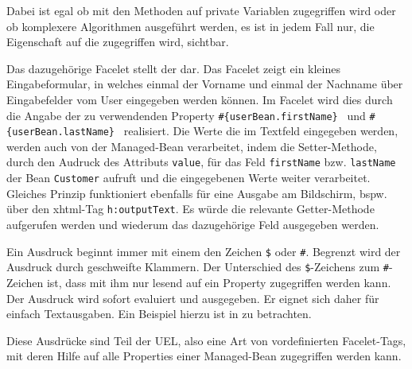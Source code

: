 \documentclass[12pt, twoside, a4paper, ngerman]{article}
\begin{document}
Dabei ist egal ob mit den Methoden auf private Variablen zugegriffen wird oder ob komplexere Algorithmen ausgeführt werden, es ist in jedem Fall nur, die Eigenschaft auf die zugegriffen wird, sichtbar.

Das dazugehörige Facelet stellt der  dar. Das Facelet zeigt ein kleines Eingabeformular, in welches einmal der Vorname und einmal der Nachname über Eingabefelder vom User eingegeben werden können. Im Facelet wird dies durch die Angabe der zu verwendenden Property \texttt{\#\{userBean.firstName\} } und \texttt{\#\{userBean.lastName\} } realisiert. Die Werte die im Textfeld eingegeben werden, werden auch von der Managed-Bean verarbeitet, indem die Setter-Methode, durch den Audruck des Attributs \texttt{value}, für das Feld \texttt{firstName} bzw. \texttt{lastName} der Bean \texttt{Customer} aufruft und die eingegebenen Werte weiter verarbeitet.
Gleiches Prinzip funktioniert ebenfalls für eine Ausgabe am Bildschirm, bspw. über den xhtml-Tag \texttt{h:outputText}. Es würde die relevante Getter-Methode aufgerufen werden und wiederum das dazugehörige Feld ausgegeben werden. 

	

Ein Ausdruck beginnt immer mit einem den Zeichen \texttt{\$} oder \texttt{\#}. Begrenzt wird der Ausdruck durch geschweifte Klammern. Der Unterschied des \texttt{\$}-Zeichens zum \texttt{\#}-Zeichen ist, dass mit ihm nur lesend auf ein Property zugegriffen werden kann.
Der Ausdruck wird sofort evaluiert und ausgegeben. Er eignet sich daher für einfach Textausgaben. Ein Beispiel hierzu ist in  zu betrachten. 

Diese Ausdrücke sind Teil der \ac{UEL}, also eine Art von vordefinierten Facelet-Tags, mit deren Hilfe auf alle Properties einer Managed-Bean zugegriffen werden kann. 
	
	
\end{document}
